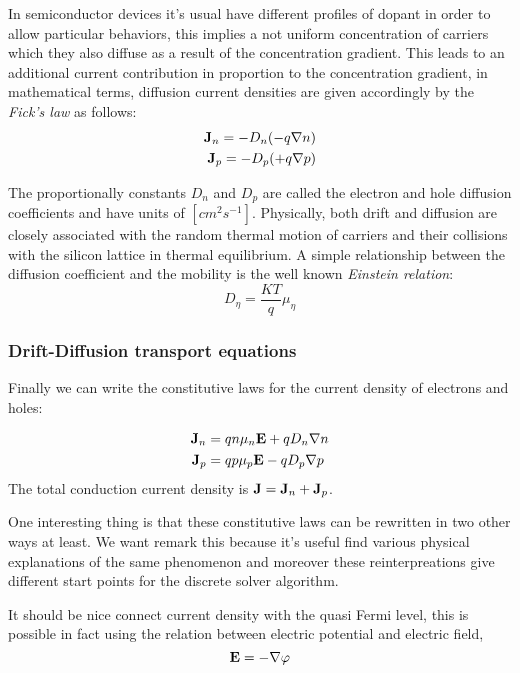 In semiconductor devices it's usual have different profiles of dopant in order to allow particular behaviors, this implies a not uniform concentration of carriers which they also diffuse as a result of the concentration gradient. This leads to an additional current contribution in proportion to the concentration gradient, in mathematical terms, diffusion current densities are given accordingly by the \textit{Fick's law} as follows:
\begin{align}
\mathbf{J}_n = -D_n(-q\nabla n) \\
\mathbf{J}_p = -D_p(+q\nabla p)
\end{align}

The proportionally constants $D_n$ and $D_p$ are called the electron and hole diffusion coefficients and have units of $[cm^2s^{-1}]$. Physically, both drift and diffusion are closely associated with the random thermal motion of carriers and their collisions with the silicon lattice in thermal equilibrium. A simple relationship between the diffusion coefficient and the mobility is the well known \textit{Einstein relation}:
\begin{equation}
D_\eta = \dfrac{KT}{q}\mu_\eta
\end{equation}

\subsubsection{Drift-Diffusion transport equations}

Finally we can write the constitutive laws for the current density of electrons and holes:

\begin{align}
\mathbf{J}_n &= qn\mu_n\mathbf{E} + qD_n\nabla n  \label{eq: drift diff electron}\\ 
\mathbf{J}_p &= qp\mu_p\mathbf{E} - qD_p \nabla p \label{eq: drift diff hole}
\end{align}
The total conduction current density is $\mathbf{J}=\mathbf{J}_n+\mathbf{J}_p$.

One interesting thing is that these constitutive laws can be rewritten in two other ways at least. We want remark this because it's useful find various physical explanations of the same phenomenon and moreover these reinterpreations  give different start points for the discrete solver algorithm.

It should be nice connect current density with the quasi Fermi level, this is possible in fact using the relation between electric potential and electric field,
\begin{equation}
\mathbf{E}  = -\nabla \varphi
\end{equation}

